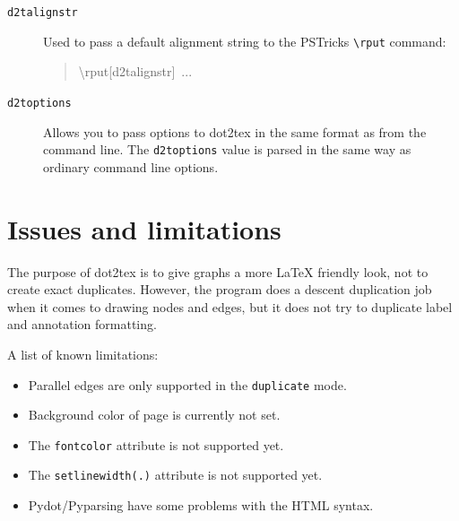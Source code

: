 \documentclass[10pt,a4paper,english]{article}
\begin{document}
\begin{description}
\item[{\texttt{d2talignstr}}] \leavevmode 
Used to pass a default alignment string to the PSTricks \texttt{{\textbackslash}rput} command:
\begin{quote}{\ttfamily \raggedright \noindent
{\textbackslash}rput{[}d2talignstr{]}~...
}\end{quote}

\item[{\texttt{d2toptions}}] \leavevmode 
Allows you to pass options to dot2tex in the same format as from the command line. The \texttt{d2toptions} value is parsed in the same way as ordinary command line options.

\end{description}



\hypertarget{issues-and-limitations}{}
\section*{Issues and limitations}
\label{issues-and-limitations}

The purpose of dot2tex is to give graphs a more LaTeX friendly look, not to create exact duplicates. However, the program does a descent duplication job when it comes to drawing nodes and edges, but it does not try to duplicate label and annotation formatting.

A list of known limitations:
\begin{itemize}
\item {} 
Parallel edges are only supported in the \texttt{duplicate} mode.

\item {} 
Background color of page is currently not set.

\item {} 
The \texttt{fontcolor} attribute is not supported yet.

\item {} 
The \texttt{setlinewidth(.)} attribute is not supported yet.

\item {} 
Pydot/Pyparsing have some problems with the HTML syntax.


\end{itemize}


\end{document}
